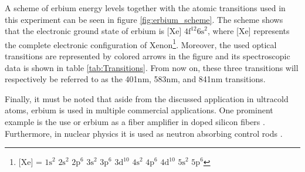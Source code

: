 A scheme of erbium energy levels together with the atomic transitions used in this experiment can be seen in figure \ref{fig:erbium_scheme}. The scheme shows that the electronic ground state of erbium is $\text{[Xe] }\text{4f}^{12} \text{6s}^2$, where [Xe]
represents the complete electronic configuration of Xenon\footnote{$\text{[Xe] = }\text{1s}^2 \text{ 2s}^2 \text{ 2p}^6 \text{ 3s}^2 \text{ 3p}^6 \text{ 3d}^{10} \text{ 4s}^2 \text{ 4p}^6 \text{ 4d}^{10} \text{ 5s}^2 \text{ 5p}^6$}. Moreover, the used optical transitions are represented by colored arrows in the figure and its spectroscopic data is shown in table \ref{tab:Transitions}. From now on, these three transitions will respectively be referred to as the 401nm, 583nm, and 841nm transitions.

Finally, it must be noted that aside from the discussed application in ultracold atoms, erbium is used in multiple commercial applications. One prominent example is the use or erbium as a fiber amplifier in doped silicon fibers \cite{mears1987low}. Furthermore, in nuclear physics it is used as neutron absorbing control rods \cite{emsley2011nature}.


